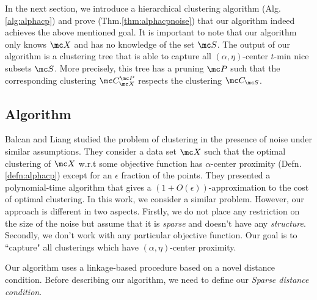 \documentclass[11pt]{article}
\begin{document}
In the next section, we introduce a hierarchical clustering algorithm (Alg.\ref{alg:alphacp}) and prove (Thm.\ref{thm:alphacpnoise}) that our algorithm indeed achieves the above mentioned goal.
It is important to note that our algorithm only knows $\mc X$ and has no knowledge of the set $\mc S$.
The output of our algorithm is a clustering tree that is able to capture all $(\alpha, \eta)$-center $t$-min nice subsets $\mc S$. More precisely, this tree has a pruning $\mc P$ such that the corresponding clustering $\mc C_{\mc X}^{\mc P}$ respects the clustering $\mc C_{\mc S}$. 

\subsection{Algorithm}
Balcan and Liang studied the problem of clustering in the presence of noise under similar assumptions. They consider a data set $\mc X$ such that the optimal clustering of $\mc X$ w.r.t some objective function has $\alpha$-center proximity (Defn.\ref{defn:alphacp}) except for an $\epsilon$ fraction of the points. They presented a polynomial-time algorithm that gives a $(1+O(\epsilon))$-approximation to the cost of optimal clustering. %
In this work, we consider a similar problem. However, our approach is different in two aspects. Firstly, we do not place any restriction on the size of the noise but assume that it is {\it sparse} and doesn't have any {\it structure}. Secondly, we don't work with any particular objective function. Our goal is to ``capture" all clusterings which have $(\alpha, \eta)$-center proximity.

Our algorithm uses a linkage-based procedure based on a novel distance condition. Before describing our algorithm, we need to define our {\it Sparse distance condition}.
\end{document}
